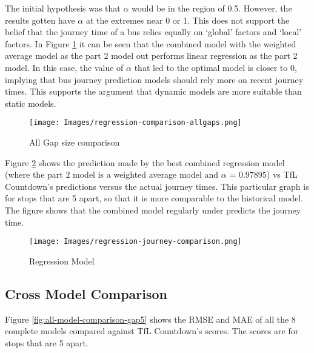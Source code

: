 The initial hypothesis was that $\alpha$ would be in the region of 0.5. However, the results gotten have $\alpha$ at the extremes near 0 or 1. This does not support the belief that the journey time of a bus relies equally on `global' factors and `local' factors. In Figure \ref{fig:regression-comparison-allgaps} it can be seen that the combined model with the weighted average model as the part 2 model out performs linear regression as the part 2 model. In this case, the value of $\alpha$ that led to the optimal model is closer to 0, implying that bus journey prediction models should rely more on recent journey times. This supports the argument that dynamic models are more suitable than static models.

\begin{figure}[H]
\begin{center}
    \texttt{[image: Images/regression-comparison-allgaps.png]}
    \caption{All Gap size comparison}
    \label{fig:regression-comparison-allgaps}
\end{center}
\end{figure}

Figure \ref{fig:regression-gap5-journey-comparison} shows the prediction made by the best combined regression model (where the part 2 model is a weighted average model and $\alpha$ = 0.97895) vs TfL Countdown's predictions versus the actual journey times. This particular graph is for stops that are 5 apart, so that it is more comparable to the historical model. The figure shows that the combined model regularly under predicts the journey time.

\begin{figure}[H]
\begin{center}
    \texttt{[image: Images/regression-journey-comparison.png]}
    \caption{Regression Model}
    \label{fig:regression-gap5-journey-comparison}
\end{center}
\end{figure}

\subsection{Cross Model Comparison}

Figure \ref{fig:all-model-comparison-gap5} shows the RMSE and MAE of all the 8 complete models compared against TfL Countdown's scores. The scores are for stops that are 5 apart. \\

